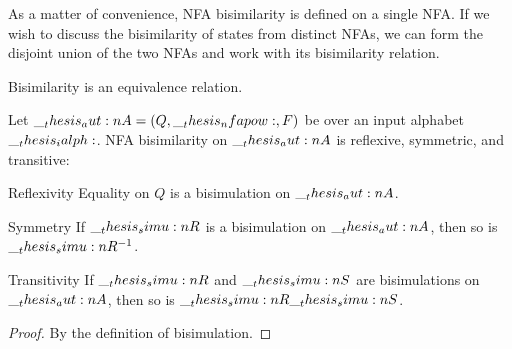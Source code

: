 As a matter of convenience, \ac{NFA} bisimilarity is defined on a single \ac{NFA}.
If we wish to discuss the bisimilarity of states from distinct \acp{NFA}, we can form the disjoint union of the two \acp{NFA} and work with its bisimilarity relation.

Bisimilarity is an equivalence relation.
\begin{theorem}\label{thm:nfa-bisim-equiv}
  Let $\__thesis_aut:n {A} = (Q, \__thesis_nfapow:, F)$ be  over an input alphabet $\__thesis_ialph:$.
  \Ac{NFA} bisimilarity on $\__thesis_aut:n {A}$ is reflexive, symmetric, and transitive:
  \begin{thmdescription}[nosep]
  \item[Reflexivity] Equality on $Q$ is a bisimulation on $\__thesis_aut:n {A}$.
  \item[Symmetry] If $\__thesis_simu:n {R}$ is a bisimulation on $\__thesis_aut:n {A}$, then so is $\__thesis_simu:n {R}^{-1}$.
  \item[Transitivity] If $\__thesis_simu:n {R}$ and $\__thesis_simu:n {S}$ are bisimulations on $\__thesis_aut:n {A}$, then so is $\__thesis_simu:n {R}\__thesis_simu:n {S}$.
  \end{thmdescription}
\end{theorem}
\begin{proof}
  By the definition of bisimulation.
\end{proof}



